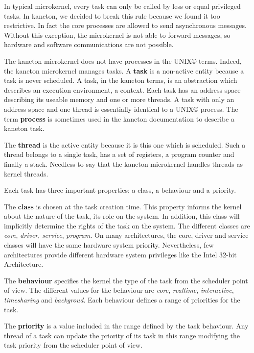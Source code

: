 \begin{multicols}{2}
In typical microkernel, every task can only be called by less or equal
privileged tasks. In kaneton, we decided to break this rule because we found
it too restrictive. In fact the core processes are allowed to send
asynchronous messages. Without this exception, the microkernel is not able
to forward messages, so hardware and software communications are not
possible.

The kaneton microkernel does not have processes in the
UNIX{\scriptsize \copyright} terms. Indeed, the kaneton microkernel manages
tasks. A \textbf{task} is a non-active entity because a task is never
scheduled. A task, in the kaneton terms, is an abstraction which describes
an execution environment, a context. Each task has an address space describing
its useable memory and one or more threads. A task with only an address
space and one thread is essentially identical to a UNIX{\scriptsize \copyright}
process. The term \textbf{process} is sometimes used in the kaneton
documentation to describe a kaneton task.

The \textbf{thread} is the active entity because it is this one which is
scheduled. Such a thread belongs to a single task, has a set of registers,
a program counter and finally a stack. Needless to say that the kaneton
microkernel handles threads as kernel threads.

Each task has three important properties: a class, a behaviour and a priority.

The \textbf{class} is chosen at the task creation time. This property
informs the kernel about the nature of the task, its role on the system.
In addition, this class will implicitly determine the rights of the task
on the system. The different classes are \textit{core}, \textit{driver},
\textit{service}, \textit{program}. On many architectures, the core, driver
and service classes will have the same hardware system priority.
Nevertheless, few architectures provide different hardware system privileges
like the Intel 32-bit Architecture.

The \textbf{behaviour} specifies the kernel the type of the task from the
scheduler point of view. The different values for the behaviour are
\textit{core}, \textit{realtime}, \textit{interactive}, \textit{timesharing}
and \textit{backgroud}. Each behaviour defines a range of priorities for the
task.

The \textbf{priority} is a value included in the range defined by the
task behaviour. Any thread of a task can update the priority of its
task in this range modifying the task priority from the scheduler
point of view.


\end{multicols}
